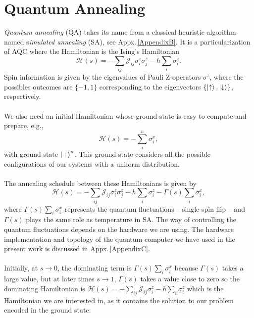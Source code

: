 \section{Quantum Annealing}
\textit{Quantum annealing} (QA) takes its name from a classical heuristic algorithm named s\textit{imulated annealing} (SA), see Appx.\,\ref{AppendixB}. It is a particularization of AQC where the Hamiltonian is the Ising's Hamiltonian
\begin{equation}
    \mathcal{H}(s) = -\sum_{ij}\mathcal{J}_{ij}\sigma_{i}^{z}\sigma_{j}^{z} - h\sum_{i}\sigma_{i}^{z}.
\end{equation}
Spin information is given by the eigenvalues of Pauli Z-operators $\sigma^{z}$, where the possibles outcomes are $\{-1,1\}$ corresponding to the eigenvectors $\{\ket{\uparrow},\ket{\downarrow}\}$, respectively.\\\\
We also need an initial Hamiltonian whose ground state is easy to compute and prepare, e.g.,
\begin{equation}
    \mathcal{H}(s) = -\sum_{i}^{n}\sigma_{i}^{x},
\end{equation}
with ground state $\ket{+}^{n}$. This ground state considers all the possible configurations of our systems with a uniform distribution.\\\\
The annealing schedule between these Hamiltonians is given by
\begin{equation}
    \mathcal{H}(s) = -\sum_{ij}\mathcal{J}_{ij}\sigma_{i}^{z}\sigma_{j}^{z} - h\sum_{i}\sigma_{i}^{z} - \Gamma(s)\sum_{i}\sigma_{i}^{x},
\end{equation}
where $\Gamma(s)\sum_{i}\sigma_{i}^{x}$ represents the quantum fluctuations -- single-spin flip -- and $\Gamma(s)$ plays the same role as temperature in SA. The way of controlling the quantum fluctuations depends on the hardware we are using. The hardware implementation and topology of the quantum computer we have used in the present work is discussed in Appx.\,\ref{AppendixC}.\\\\
Initially, at $s \rightarrow 0$, the dominating term is $\Gamma(s)\sum_{i}\sigma_{i}^{x}$ because $\Gamma(s)$ takes a large value, but at later times $s \rightarrow 1$, $\Gamma(s)$ takes a value close to zero so the dominating Hamiltonian is $\mathcal{H}(s) = -\sum_{ij}\mathcal{J}_{ij}\sigma_{i}^{z} - h\sum_{i}\sigma_{i}^{z}$ which is the Hamiltonian we are interested in, as it contains the solution to our problem encoded in the ground state.
